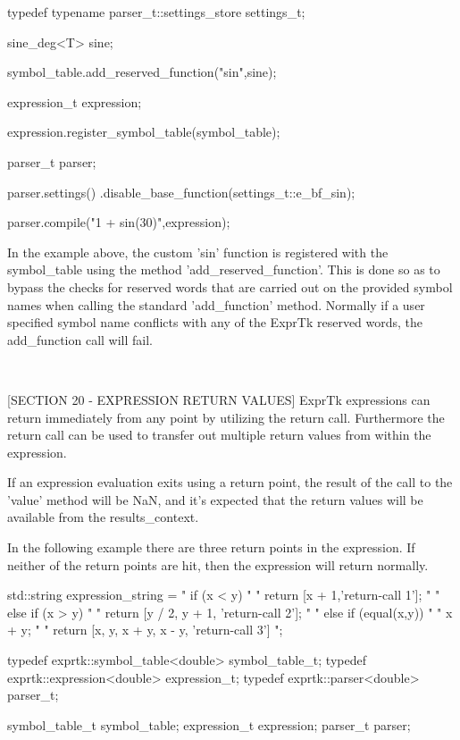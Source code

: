 typedef typename parser\_t::settings\_store settings\_t;

sine\_deg<T> sine;

symbol\_table.add\_reserved\_function("sin",sine);

expression\_t expression;

expression.register\_symbol\_table(symbol\_table);

parser\_t parser;

parser.settings()
.disable\_base\_function(settings\_t::e\_bf\_sin);

parser.compile("1 + sin(30)",expression);


In the example above, the custom 'sin' function is registered with the
symbol\_table using the method 'add\_reserved\_function'. This is done so
as to bypass the checks for reserved words that are carried out on the
provided symbol names when calling the standard 'add\_function' method.
Normally if  a user  specified symbol  name conflicts  with any of the
ExprTk reserved words, the add\_function call will fail.

~~~~~~~~~~~~~~~~~~~~~~~~~~~~~~~~~~~~~~~~~~~~~~~~~~~~~~~~~~

[SECTION 20 - EXPRESSION RETURN VALUES]
ExprTk expressions can return immediately from any point by  utilizing
the return call. Furthermore the  return call can be used  to transfer
out multiple return values from within the expression.

If an expression evaluation exits using a return point, the result  of
the call to the 'value' method will be NaN, and it's expected that the
return values will be available from the results\_context.

In  the  following example  there  are  three  return  points  in  the
expression.  If  neither  of  the  return  points  are  hit,  then the
expression will return normally.

std::string expression\_string =
" if (x < y)                                   "
"   return [x + 1,'return-call 1'];            "
" else if (x > y)                              "
"   return [y / 2, y + 1, 'return-call 2'];    "
" else if (equal(x,y))                         "
"   x + y;                                     "
" return [x, y, x + y, x - y, 'return-call 3'] ";

typedef exprtk::symbol\_table<double> symbol\_table\_t;
typedef exprtk::expression<double>     expression\_t;
typedef exprtk::parser<double>             parser\_t;

symbol\_table\_t symbol\_table;
expression\_t   expression;
parser\_t       parser;

